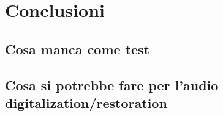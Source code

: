 
\chapter{Conclusioni} \label{chp:conclusioni}









\section{Cosa manca come test}  %
\section{Cosa si potrebbe fare per l'audio digitalization/restoration}  %